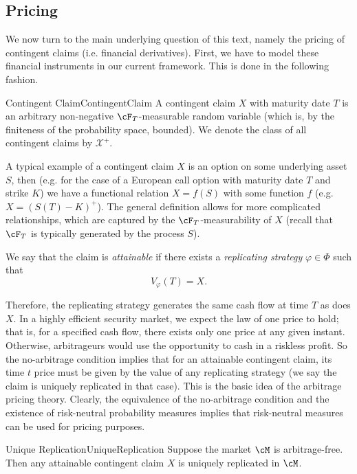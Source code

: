 \subsection{Pricing}
We now turn to the main underlying question of this text, namely the pricing of contingent claims (i.e. financial derivatives). First, we have to model these financial instruments in our current framework. This is done in the following fashion.

\begin{defn}{Contingent Claim}{ContingentClaim}
	A contingent claim \(X\) with maturity date \(T\) is an arbitrary non-negative \(\cF_T\)-measurable random variable (which is, by the finiteness of the probability space, bounded). We denote the class of all contingent claims by \(\mathcal{X}^+\).
\end{defn}

A typical example of a contingent claim \(X\) is an option on some underlying asset \(S\), then (e.g. for the case of a European call option with maturity date \(T\) and strike \(K\)) we have a functional relation \(X = f(S)\) with some function \(f\) (e.g. \(X = (S(T) - K)^+\)). The general definition allows for more complicated relationships, which are captured by the \(\cF_T\)-measurability of \(X\) (recall that \(\cF_T\) is typically generated by the process \(S\)).

We say that the claim is \textit{attainable} if there exists a \textit{replicating strategy} \(\varphi \in \Phi\) such that
\[
	V_{\varphi}(T) = X.
\]

Therefore, the replicating strategy generates the same cash flow at time \(T\) as does \(X\). In a highly efficient security market, we expect the law of one price to hold; that is, for a specified cash flow, there exists only one price at any given instant. Otherwise, arbitrageurs would use the opportunity to cash in a riskless profit. So the no-arbitrage condition implies that for an attainable contingent claim, its time \(t\) price must be given by the value of any replicating strategy (we say the claim is uniquely replicated in that case). This is the basic idea of the arbitrage pricing theory. Clearly, the equivalence of the no-arbitrage condition and the existence of risk-neutral probability measures implies that risk-neutral measures can be used for pricing purposes.

\begin{prop}{Unique Replication}{UniqueReplication}
	Suppose the market \(\cM\) is arbitrage-free. Then any attainable contingent claim \(X\) is uniquely replicated in \(\cM\).
\end{prop}

